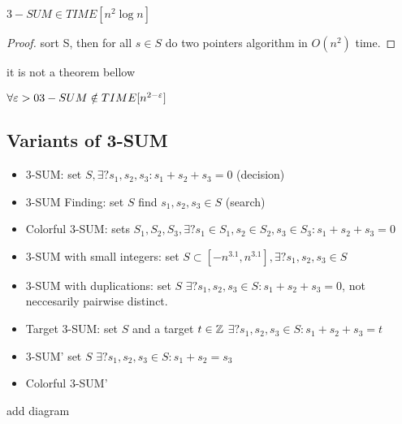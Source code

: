 \begin{crly}
	$3-SUM \in TIME[n^2 \log n]$
\end{crly}

\begin{proof}
	sort S, then
	for all $s \in S$ do two pointers algorithm in $O(n^2)$ time.
\end{proof}

{\color{red} it is not a theorem bellow}
\begin{thm}
	$\forall \varepsilon > 0 3-SUM \notin TIME[n^{2 - \varepsilon}]$
\end{thm}

\subsection{Variants of 3-SUM}

\begin{itemize}
	\item 3-SUM: set $S, \exists ? s_1, s_2, s_3 : s_1 + s_2 + s_3 = 0$ (decision)
	\item 3-SUM Finding: set $S$ find $s_1, s_2, s_3 \in S$ (search)
	\item Colorful 3-SUM: sets $S_1, S_2, S_3, \exists ? s_1 \in S_1, s_2 \in S_2, s_3 \in S_3: s_1 + s_2 + s_3 = 0$
	\item 3-SUM with small integers: set $S \subset [-n^{3.1}, n^{3.1}], \exists? s_1, s_2, s_3 \in S$
	\item 3-SUM with duplications: set $S$ $\exists ? s_1, s_2, s_3 \in S: s_1 + s_2 + s_3 = 0$, not neccesarily pairwise distinct.
	\item Target 3-SUM: set $S$ and a target $t \in \mathbb{Z}$ $\exists ? s_1, s_2, s_3 \in S: s_1 + s_2 + s_3 = t$
	\item 3-SUM' set $S $ $\exists ? s_1, s_2, s_3 \in S: s_1 + s_2 = s_3$
	\item Colorful 3-SUM'

\end{itemize}

{\color{red} add diagram}

